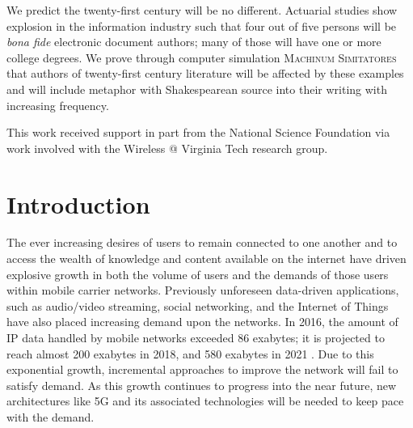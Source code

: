 \documentclass[12pt,dvips]{report}
\begin{document}
We predict the twenty-first century will be no different.  Actuarial
studies show explosion in the information industry such that four out
of five persons will be \textit{bona fide} electronic document
authors; many of those will have one or more college degrees.  We
prove through computer simulation \textsc{Machinum Simitatores} that
authors of twenty-first century literature will be affected by these
examples and will include metaphor with Shakespearean source into
their writing with increasing frequency.
\fi

\vfill


This work received support in part from the National Science Foundation via work involved with the Wireless @ Virginia Tech research group.

\iffalse
That this work received support from the Southeastern Universities
Research Association (SURA) ``Monticello Library Project'' is purely
coincidental.
\fi

\pagebreak


\tableofcontents
\pagebreak

\listoffigures
\pagebreak

\listoftables
\pagebreak

\pagestyle{myheadings}

\chapter{Introduction} \label{ch:intro}

The ever increasing desires of users to remain connected to one another and to access the wealth of knowledge and content available on the internet have driven explosive growth in both the volume of users and the demands of those users within mobile carrier networks.  Previously unforeseen data-driven applications, such as audio/video streaming, social networking, and the Internet of Things have also placed increasing demand upon the networks.  In 2016, the amount of IP data handled by mobile networks exceeded 86 exabytes; it is projected to reach almost 200 exabytes in 2018, and 580 exabytes in 2021 \cite{ciscoVNI2017}.  Due to this exponential growth, incremental approaches to improve the network will fail to satisfy demand. \iffalse This growth has been possible up to this point because of the progress of cellular network technologies allowing for new network topologies and more efficient use of spectrum. \fi As this growth continues to progress into the near future, new architectures like 5G and its associated technologies will be needed to keep pace with the demand.
\end{document}
